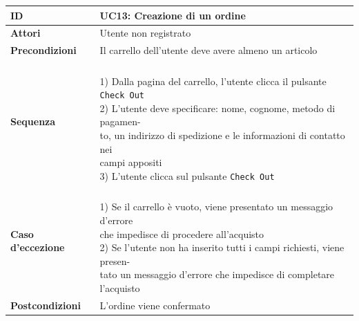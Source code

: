 \documentclass[12pt,a4paper]{article}
\begin{document}
	\newpage
	\begin{tabular}{|l|l|}
		\hline
		\textbf{ID} & UC13: Creazione di un ordine\\
		\hline
		\textbf{Attori} & Utente non registrato\\
		\hline
		\textbf{Precondizioni} & \makecell[l]{Il carrello dell'utente deve avere almeno un articolo\vspace{5px}\\}\\
		\hline
		\textbf{Sequenza} & \makecell[l]{\\1) Dalla pagina del carrello, l'utente clicca il pulsante \texttt{Check Out}\vspace{5px}\\
		2) L'utente deve specificare: nome, cognome, metodo di pagamen-\\
		\hspace{15px}to, un indirizzo di spedizione e le informazioni di contatto nei\\
		\hspace{15px}campi appositi \vspace{5px}\\
		3) L'utente clicca sul pulsante \texttt{Check Out}\vspace{5px}\\}\\
		\hline
		\textbf{Caso d'eccezione} & \makecell[l]{\\1) Se il carrello è vuoto, viene presentato un messaggio d'errore\\
		\hspace{15px}che impedisce di procedere all'acquisto\vspace{5px}\\
		2) Se l'utente non ha inserito tutti i campi richiesti, viene presen-\\\hspace{15px}tato un messaggio d'errore che impedisce di completare\\\hspace{15px} l'acquisto\vspace{5px}\\}\\
		\hline
		\textbf{Postcondizioni} & L'ordine viene confermato\\
		\hline
	\end{tabular}
	\vspace{20px}
\end{document}
